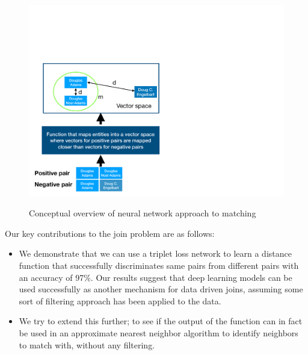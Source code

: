 \begin{figure}
\centering
\includegraphics[width=1\linewidth]{fig2}
\label{fig-1}
\caption{Conceptual overview of neural network approach to matching}
\end{figure}

Our key contributions to the join problem are as follows:
\begin{itemize}
\item We demonstrate that we can use a triplet loss network to learn a distance function that successfully discriminates same pairs from different pairs with an accuracy of 97\%.  Our results suggest that deep learning models can be used successfully as another mechanism for data driven joins, assuming some sort of filtering approach has been applied to the data.
\item We try to extend this further; to see if the output of the function can in fact be used in an approximate nearest neighbor algorithm to identify neighbors to match with, without any filtering. 
\end{itemize}

